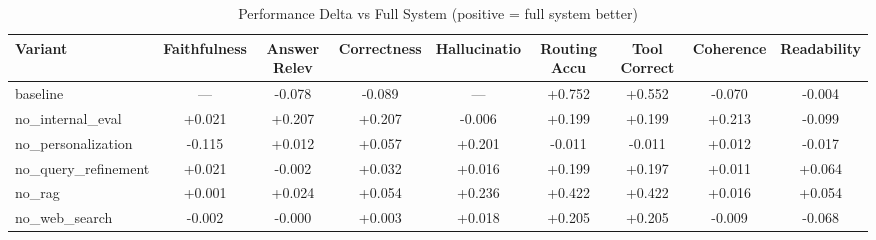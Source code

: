 \begin{table}[htbp]
\centering
\caption{Performance Delta vs Full System (positive = full system better)}
\label{tab:deltas}
\begin{tabular}{lcccccccc}
\toprule
Variant & Faithfulness & Answer Relev & Correctness & Hallucinatio & Routing Accu & Tool Correct & Coherence & Readability \\
\midrule
baseline & — & -0.078 & -0.089 & — & +0.752 & +0.552 & -0.070 & -0.004 \\
no\_internal\_eval & +0.021 & +0.207 & +0.207 & -0.006 & +0.199 & +0.199 & +0.213 & -0.099 \\
no\_personalization & -0.115 & +0.012 & +0.057 & +0.201 & -0.011 & -0.011 & +0.012 & -0.017 \\
no\_query\_refinement & +0.021 & -0.002 & +0.032 & +0.016 & +0.199 & +0.197 & +0.011 & +0.064 \\
no\_rag & +0.001 & +0.024 & +0.054 & +0.236 & +0.422 & +0.422 & +0.016 & +0.054 \\
no\_web\_search & -0.002 & -0.000 & +0.003 & +0.018 & +0.205 & +0.205 & -0.009 & -0.068 \\
\bottomrule
\end{tabular}
\end{table}
